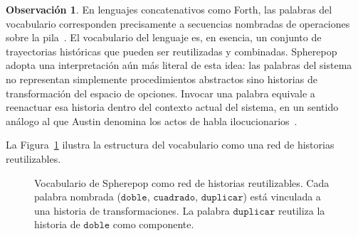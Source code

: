 \documentclass[12pt]{article}
\theoremstyle{plain}
\theoremstyle{definition}
\newtheorem{remark}[theorem]{Observación}
\begin{document}
\begin{remark}
En lenguajes concatenativos como Forth, las palabras del vocabulario corresponden precisamente a secuencias nombradas de operaciones sobre la pila~\cite{moore}. El vocabulario del lenguaje es, en esencia, un conjunto de trayectorias históricas que pueden ser reutilizadas y combinadas. Spherepop adopta una interpretación aún más literal de esta idea: las palabras del sistema no representan simplemente procedimientos abstractos sino historias de transformación del espacio de opciones. Invocar una palabra equivale a reenactuar esa historia dentro del contexto actual del sistema, en un sentido análogo al que Austin denomina los actos de habla ilocucionarios~\cite{austin}.
\end{remark}

La Figura~\ref{fig:vocabulario} ilustra la estructura del vocabulario como una red de historias reutilizables.

\begin{figure}[ht]
\centering
{}
\caption{Vocabulario de Spherepop como red de historias reutilizables. Cada palabra nombrada ($\mathtt{doble}$, $\mathtt{cuadrado}$, $\mathtt{duplicar}$) está vinculada a una historia de transformaciones. La palabra $\mathtt{duplicar}$ reutiliza la historia de $\mathtt{doble}$ como componente.}
\label{fig:vocabulario}
\end{figure}
\end{document}
